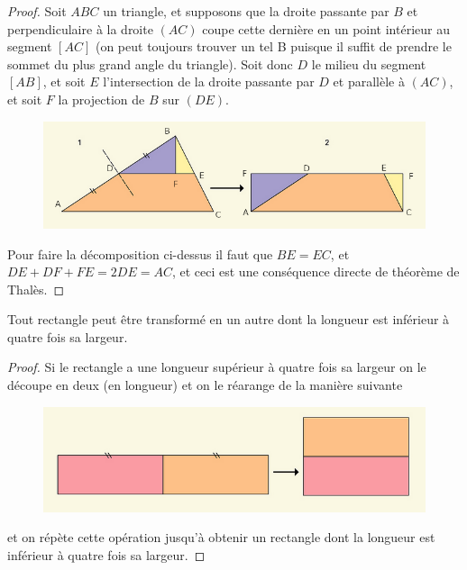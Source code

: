 \begin{proof}
  \hfill

  \noindent
  Soit $ABC$ un triangle, et supposons que la droite passante par $B$ et perpendiculaire à la droite $(AC)$ coupe cette dernière en un point intérieur au segment $[AC]$ (on peut toujours trouver un tel B puisque il suffit de prendre le sommet du plus grand angle du triangle). Soit donc $D$ le milieu du segment $[AB]$, et soit $E$ l'intersection de la droite passante par $D$ et parallèle à $(AC)$, et soit $F$ la projection de $B$ sur $(DE)$.

  \begin{figure}[h]
          \centering
          \includegraphics[scale=0.6]{images/xx1.png}

      \end{figure}
\noindent
  Pour faire la décomposition ci-dessus il faut que  $BE = EC$, et $DE+DF+FE=2DE = AC$, et ceci est une conséquence directe de théorème de Thalès.

\end{proof}
\begin{li}
  Tout rectangle peut être transformé en un autre dont la longueur est inférieur à quatre fois sa largeur.
\end{li}
\newpage
\begin{proof}
  \hfill

  \noindent
  Si le rectangle a une longueur supérieur à quatre fois sa largeur on le découpe en deux (en longueur) et on le réarange de la manière suivante
      \begin{figure}[h]
          \centering
          \includegraphics[scale=0.6]{images/x2.png}

      \end{figure}

  \noindent
  et on répète cette opération jusqu'à obtenir un rectangle dont la longueur est inférieur à quatre fois sa largeur.
\end{proof}
